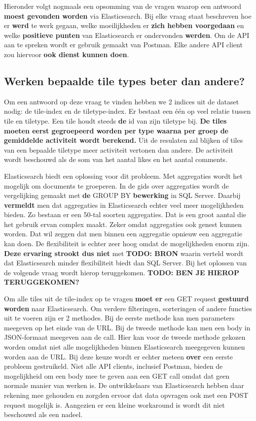 Hieronder volgt nogmaals een opsomming van de vragen waarop een antwoord \textbf{moest gevonden worden} via Elasticsearch. Bij elke vraag staat beschreven hoe er \textbf{werd} te werk gegaan, welke moeilijkheden er \textbf{zich hebben voorgedaan} en welke \textbf{positieve punten} van Elasticsearch er ondervonden \textbf{werden}. Om de API aan te spreken wordt er gebruik gemaakt van Postman. Elke andere API client zou hiervoor\textbf{ ook dienst kunnen doen}.

\subsection{Werken bepaalde tile types beter dan andere?}
Om een antwoord op deze vraag te vinden hebben we 2 indices uit de dataset nodig: de tile-index en de tiletype-index. Er bestaat een één op veel relatie tussen tile en tiletype. Een tile houdt steeds \textbf{de} id van zijn tiletype bij. \textbf{De tiles moeten eerst gegroepeerd worden per type waarna per groep de gemiddelde activiteit wordt berekend.} Uit de resulaten zal blijken of tiles van een bepaalde tiletype meer activiteit vertonen dan andere. De activiteit wordt beschouwd als de som van het aantal likes en het aantal comments.

Elasticsearch biedt een oplossing voor dit probleem. Met aggregaties wordt het mogelijk om documents te groeperen. In de gids over aggregaties wordt de vergelijking gemaakt met \textbf{de} GROUP BY \textbf{bewerking} in SQL Server. Daarbij \textbf{vermeldt} men dat aggregaties in Elasticsearch echter veel meer mogelijkheden bieden. Zo bestaan er een 50-tal soorten aggregaties. Dat is een groot aantal die het gebruik ervan complex maakt. Zeker omdat aggregaties ook genest kunnen worden. Dat wil zeggen dat men binnen een aggregatie opnieuw een aggregatie kan doen. De flexibiliteit is echter zeer hoog omdat de mogelijkheden enorm zijn. \textbf{Deze ervaring strookt dus niet} met \textbf{TODO: BRON} waarin verteld wordt dat Elasticsearch minder flexibiliteit biedt dan SQL Server. Bij het oplossen van de volgende vraag wordt hierop teruggekomen. \textbf{TODO: BEN JE HIEROP TERUGGEKOMEN?}

Om alle tiles uit de tile-index op te vragen \textbf{moet er} een GET request \textbf{gestuurd worden} naar Elasticsearch. Om verdere filteringen, sorteringen of andere functies uit te voeren zijn er 2 methodes. Bij de eerste methode kan men parameters meegeven op het einde van de URL. Bij de tweede methode kan men een body in JSON-formaat meegeven aan de call. Hier kan voor de tweede methode gekozen worden omdat niet alle mogelijkheden binnen Elasticsearch meegegeven kunnen worden aan de URL. Bij deze keuze wordt er echter meteen \textbf{over} een eerste probleem gestruikeld. Niet alle API clients, inclusief Postman, bieden de mogelijkheid om een body mee te geven aan een GET call omdat dat geen normale manier van werken is. De ontwikkelaars van Elasticsearch hebben daar rekening mee gehouden en zorgden ervoor dat data opvragen ook met een POST request mogelijk is. Aangezien er een kleine workaround is wordt dit niet beschouwd als een nadeel.

